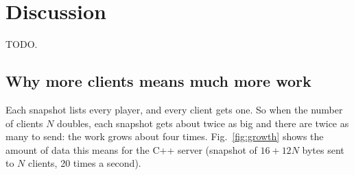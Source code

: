 \IfFileExists{IEEEtran.cls}{\ieeetrue\documentclass[conference]{IEEEtran}}{\ieeefalse\documentclass[twocolumn,10pt]{article}}
\begin{document}
\clearpage\section{Discussion}
TODO.


\subsection{Why more clients means much more work}
Each snapshot lists every player, and every client gets one. So when the number of
clients $N$ doubles, each snapshot gets about twice as big and there are twice as
many to send: the work grows about four times. Fig.~\ref{fig:growth} shows the
amount of data this means for the C++ server (snapshot of $16 + 12N$ bytes sent to
$N$ clients, 20 times a second).
\end{document}
